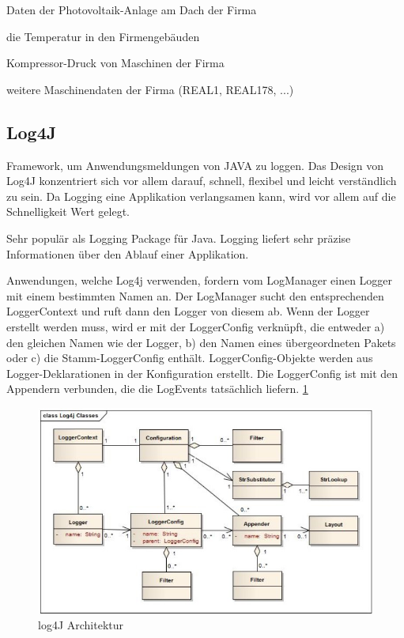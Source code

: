 \begin{compactitem}
    \item Daten der Photovoltaik-Anlage am Dach der Firma
    \item die Temperatur in den Firmengebäuden
    \item Kompressor-Druck von Maschinen der Firma
    \item weitere Maschinendaten der Firma (REAL1, REAL178, ...)
\end{compactitem}

\subsection{Log4J}
Framework, um Anwendungsmeldungen von JAVA zu loggen.
Das Design von Log4J konzentriert sich vor allem darauf, schnell, flexibel und leicht verständlich zu sein. Da Logging eine Applikation verlangsamen kann, wird vor allem auf die Schnelligkeit Wert gelegt.  \cite{log4JBuch} 

Sehr populär als Logging Package für Java. Logging liefert sehr präzise Informationen über den Ablauf einer Applikation. \cite{log4J}



Anwendungen, welche Log4j verwenden, fordern vom LogManager einen Logger mit einem bestimmten Namen an. Der LogManager sucht den entsprechenden LoggerContext und ruft dann den Logger von diesem ab. 
Wenn der Logger erstellt werden muss, wird er mit der LoggerConfig verknüpft, die entweder a) den gleichen Namen wie der Logger, b) den Namen eines übergeordneten Pakets oder c) die Stamm-LoggerConfig enthält. LoggerConfig-Objekte werden aus Logger-Deklarationen in der Konfiguration erstellt. Die LoggerConfig ist mit den Appendern verbunden, die die LogEvents tatsächlich liefern. \ref{fig:impl:log4jArchitektur} \cite{log4J}

\begin{figure}[h t]
    \centering
    \includegraphics[scale=0.7]{pics/log4jArchitektur.jpg}
    \caption{log4J Architektur \cite{log4J}}
    \label{fig:impl:log4jArchitektur}
\end{figure}